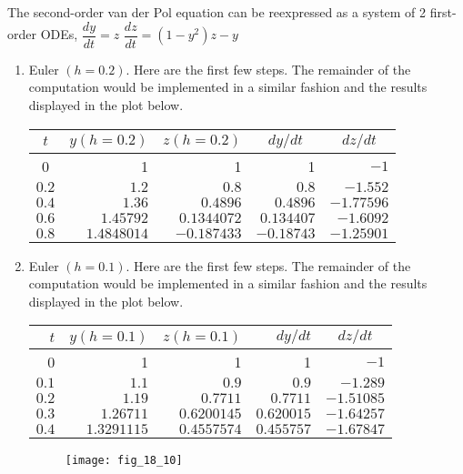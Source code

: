 \documentclass[../main.tex]{subfiles}
\begin{document}
\section{}
The second-order van der Pol equation can be reexpressed as a system of 2 first-order ODEs,
	\bigbreak
$\dfrac{d y}{d t}=z$
	\bigbreak
$\dfrac{d z}{d t}=\left(1-y^{2}\right) z-y$
	\bigbreak
\begin{enumerate}[label=\bfseries(\alph*)]
\item Euler $(h=0.2)$. Here are the first few steps. The remainder of the computation would be implemented in a similar fashion and the results displayed in the plot below.
	\bigbreak
\begin{tabular}{crrrr}
\hline
$t$ & $y(h=0.2)$ & $z(h=0.2)$ & \multicolumn{1}{c}{$d y / d t$} & \multicolumn{1}{c}{$d z / d t$} \\
\hline
0 & 1 & 1 & 1 & $-1$ \\
$0.2$ & $1.2$ & $0.8$ & $0.8$ & $-1.552$ \\
$0.4$ & $1.36$ & $0.4896$ & $0.4896$ & $-1.77596$ \\
$0.6$ & $1.45792$ & $0.1344072$ & $0.134407$ & $-1.6092$ \\
$0.8$ & $1.4848014$ & $-0.187433$ & $-0.18743$ & $-1.25901$ \\
\hline
\end{tabular}
	\bigbreak
\item Euler $(h=0.1)$. Here are the first few steps. The remainder of the computation would be implemented in a similar fashion and the results displayed in the plot below.
	\bigbreak
\begin{tabular}{rrrrr}
\hline
$t$ & $y(h=0.1)$ & $z(h=0.1)$ & $d y / d t$ & \multicolumn{1}{c}{$d z / d t$} \\
\hline
0 & 1 & 1 & 1 & $-1$ \\
$0.1$ & $1.1$ & $0.9$ & $0.9$ & $-1.289$ \\
$0.2$ & $1.19$ & $0.7711$ & $0.7711$ & $-1.51085$ \\
$0.3$ & $1.26711$ & $0.6200145$ & $0.620015$ & $-1.64257$ \\
$0.4$ & $1.3291115$ & $0.4557574$ & $0.455757$ & $-1.67847$ \\
\hline
\end{tabular}
	\bigbreak
	\begin{figure}[H]
		\texttt{[image: fig\_18\_10]}
		\label{fig:fig_18_10}
	\end{figure}
	\bigbreak
\end{enumerate}
\end{document}
